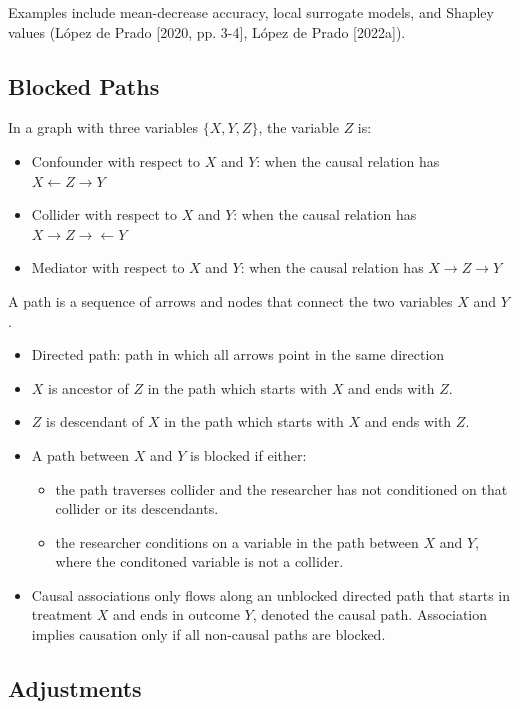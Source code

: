 \documentclass{article}
\begin{document}
Examples include mean-decrease accuracy, local surrogate models, and Shapley values (López de Prado [2020, pp. 3-4], López de Prado [2022a]). 

\subsection{Blocked Paths}

In a graph with three variables $\{ X, Y, Z \}$, the variable $Z$ is:
\begin{itemize}
  \item Confounder with respect to $X$ and $Y$: when the causal relation has $X \leftarrow Z \to Y$
  \item Collider with respect to $X$ and $Y$: when the causal relation has $X \to Z \to \leftarrow Y$
  \item Mediator with respect to $X$ and $Y$: when the causal relation has $X \to Z \to Y$
\end{itemize}

A path is a sequence of arrows and nodes that connect the two variables $X$ and $Y$.

\begin{itemize}
  \item Directed path: path in which all arrows point in the same direction
  \item $X$ is ancestor of $Z$ in the path which starts with $X$ and ends with $Z$.
  \item $Z$ is descendant of $X$ in the path which starts with $X$ and ends with $Z$.
  \item A path between $X$ and $Y$ is blocked if either:
  \begin{itemize}
    \item the path traverses collider and the researcher has not conditioned on that collider or its descendants.
    \item the researcher conditions on a variable in the path between $X$ and $Y$, where the conditoned variable is not a collider.
  \end{itemize}
  \item Causal associations only flows along an unblocked directed path that starts in treatment $X$ and ends in outcome $Y$, denoted the causal path. Association implies causation only if all non-causal paths are blocked.
\end{itemize}

\subsection{Adjustments}
\end{document}
